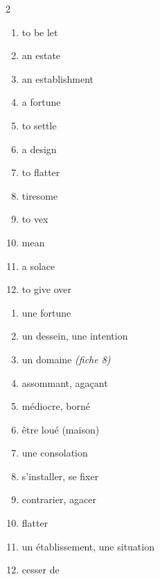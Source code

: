 \documentclass{fiche}
\begin{document}


\begin{multicols}{2}
\begin{enumerate}[label=\arabic*.,itemsep=1.2mm,leftmargin=*]
  \item to be let \hfill {}
  \item an estate \hfill {}
  \item an establishment \hfill {}
  \item a fortune \hfill {}
  \item to settle \hfill {}
  \item a design \hfill {}
  \item to flatter \hfill {}
  \item tiresome \hfill {}
  \item to vex \hfill {}
  \item mean \hfill {}
  \item a solace \hfill {}
  \item to give over \hfill {}
\end{enumerate}
\columnbreak
\begin{enumerate}[label=\alph*.,itemsep=1.2mm,leftmargin=*]
  \item une fortune
  \item un dessein, une intention
  \item un domaine \textit{(fiche 8)}
  \item assommant, agaçant
  \item médiocre, borné
  \item être loué (maison)
  \item une consolation
  \item s'installer, se fixer
  \item contrarier, agacer
  \item flatter
  \item un établissement, une situation
  \item cesser de
\end{enumerate}
\end{multicols}
\end{document}
